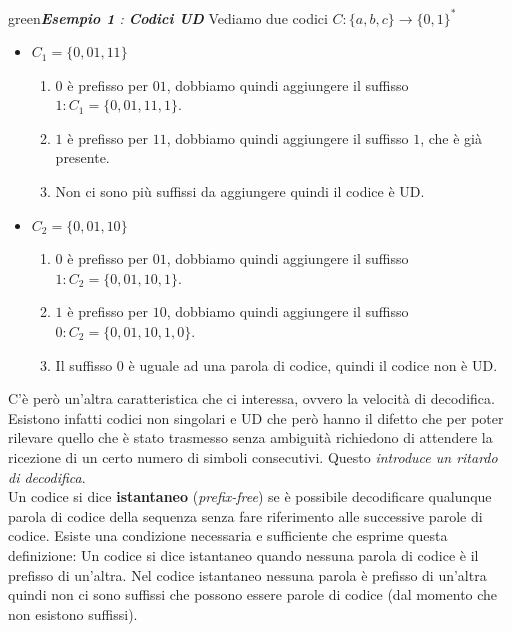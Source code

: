 \begin{mybox}{green}{\textit{\textbf{Esempio 1} : \textbf{Codici UD }}}
Vediamo due codici $C: \{a, b, c\} \to \{0, 1\}^*$
\begin{itemize}
    \item $C_1 = \{0, 01, 11\}$
    \begin{enumerate}
        \item $0$ \`e prefisso per $01$, dobbiamo quindi aggiungere il suffisso $\mathit{1}: C_1 = \{0,01,11,\mathit{1}\}$.
        \item $1$ \`e prefisso per $11$, dobbiamo quindi aggiungere il suffisso $\mathit{1}$, che \`e gi\`a presente.
        \item Non ci sono pi\`u suffissi da aggiungere quindi il codice \`e UD.
    \end{enumerate}
    \item $C_2 = \{0, 01, 10\}$
    \begin{enumerate}
        \item $0$ \`e prefisso per $01$, dobbiamo quindi aggiungere il suffisso $\mathit{1}: C_2 = \{0,01,10,\mathit{1}\}$.
        \item $1$ \`e prefisso per $10$, dobbiamo quindi aggiungere il suffisso $\mathit{0}: C_2 = \{0, 01, 10, \mathit{1}, \mathit{0}\}$.
        \item Il suffisso $\mathit{0}$ \`e uguale ad una parola di codice, quindi il codice non \`e UD.
    \end{enumerate}
\end{itemize}
\end{mybox}
C’è per\`o un’altra caratteristica che ci interessa, ovvero la velocità  di  decodifica. Esistono infatti codici non singolari e UD che però hanno il difetto che per poter rilevare quello che è stato trasmesso senza ambiguità richiedono di attendere la ricezione di un certo numero di simboli consecutivi. Questo \textit{introduce un ritardo di decodifica}. \\
Un codice si dice \textbf{istantaneo} (\textit{prefix-free}) se è possibile decodificare qualunque parola di codice della sequenza senza fare riferimento alle successive parole di codice. Esiste una condizione necessaria e sufficiente che esprime questa definizione:
 Un codice si dice istantaneo quando nessuna parola di codice è il prefisso di un'altra.
Nel  codice  istantaneo  nessuna  parola è prefisso di un’altra quindi  non  ci  sono suffissi  che  possono essere parole di codice (dal momento che non esistono suffissi).

